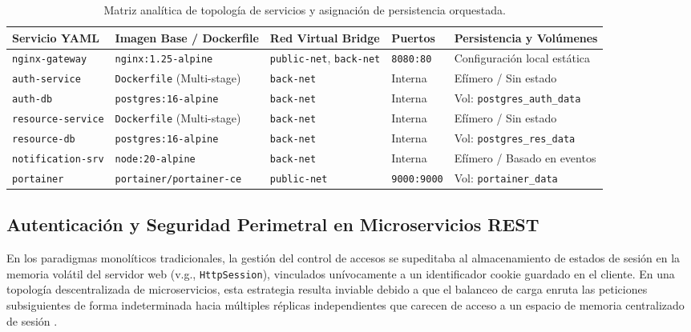 \documentclass[12pt,journal,onecolumn]{IEEEtran}
\begin{document}
\begin{table}[htbp]
\centering
\caption{Matriz analítica de topología de servicios y asignación de persistencia orquestada.}
\label{tab:topologia_completa}
\vspace{0.2cm}
\small
\begin{tabularx}{\textwidth}{l Y l Y Y}
\toprule
\textbf{Servicio YAML} & \textbf{Imagen Base / Dockerfile} & \textbf{Red Virtual Bridge} & \textbf{Puertos} & \textbf{Persistencia y Volúmenes} \\
\midrule
\texttt{nginx-gateway} & \texttt{nginx:1.25-alpine} & \texttt{public-net}, \texttt{back-net} & \texttt{8080:80} & Configuración local estática \\
\texttt{auth-service} & \texttt{Dockerfile} (Multi-stage) & \texttt{back-net} & Interna & Efímero / Sin estado \\
\texttt{auth-db} & \texttt{postgres:16-alpine} & \texttt{back-net} & Interna & Vol: \texttt{postgres\_auth\_data} \\
\texttt{resource-service} & \texttt{Dockerfile} (Multi-stage) & \texttt{back-net} & Interna & Efímero / Sin estado \\
\texttt{resource-db} & \texttt{postgres:16-alpine} & \texttt{back-net} & Interna & Vol: \texttt{postgres\_res\_data} \\
\texttt{notification-srv} & \texttt{node:20-alpine} & \texttt{back-net} & Interna & Efímero / Basado en eventos \\
\texttt{portainer} & \texttt{portainer/portainer-ce} & \texttt{public-net} & \texttt{9000:9000} & Vol: \texttt{portainer\_data} \\
\bottomrule
\end{tabularx}
\end{table}

\subsection{\textbf{Autenticación y Seguridad Perimetral en Microservicios REST}}
En los paradigmas monolíticos tradicionales, la gestión del control de accesos se supeditaba al almacenamiento de estados de sesión en la memoria volátil del servidor web (v.g., \texttt{HttpSession}), vinculados unívocamente a un identificador cookie guardado en el cliente. En una topología descentralizada de microservicios, esta estrategia resulta inviable debido a que el balanceo de carga enruta las peticiones subsiguientes de forma indeterminada hacia múltiples réplicas independientes que carecen de acceso a un espacio de memoria centralizado de sesión \cite{richardson2018, almeida2022}.
\end{document}
